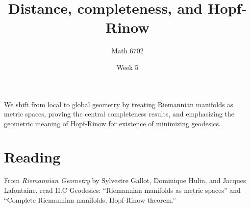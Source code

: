 \documentclass{article}
\title{Distance, completeness, and Hopf-Rinow}
\author{Math 6702}
\date{Week 5}
\begin{document}
\maketitle

We shift from local to global geometry by treating Riemannian manifolds as metric spaces, proving the central completeness results, and emphasizing the geometric meaning of Hopf-Rinow for existence of minimizing geodesics.

\section*{Reading}
From \textit{Riemannian Geometry} by Sylvestre Gallot, Dominique Hulin, and Jacques Lafontaine, read \textsection II.C Geodesics: ``Riemannian manifolds as metric spaces'' and ``Complete Riemannian manifolds, Hopf-Rinow theorem.''
\end{document}

